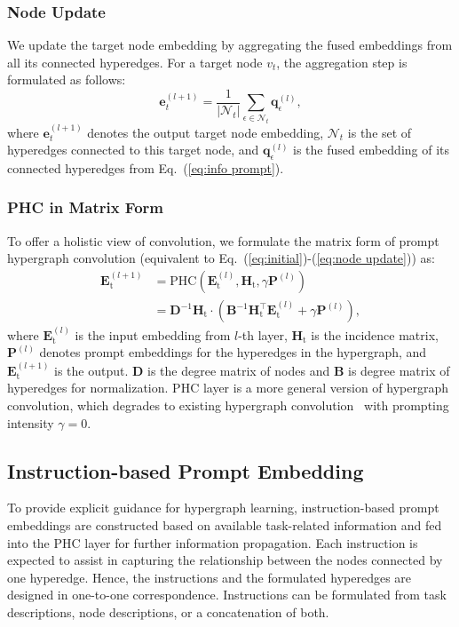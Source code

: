 \subsubsection{Node Update} We update the target node embedding by aggregating the fused embeddings from all its connected hyperedges.
For a target node $v_t$, the aggregation step is formulated as follows:
\begin{equation}\label{eq:node update}
    \mathbf{e}_t^{(l+1)} = \frac{1}{|\mathcal{N}_t|}\sum_{\epsilon\in\mathcal{N}_t}\mathbf{q}^{(l)}_{\epsilon},
\end{equation}
where $\mathbf{e}_{t}^{(l+1)}$ denotes the output target node embedding, $\mathcal{N}_t$ is the set of hyperedges connected to this target node, and $\mathbf{q}^{(l)}_{\epsilon}$ is the fused embedding of its connected hyperedges from Eq.~(\ref{eq:info prompt}).

\subsubsection{PHC in Matrix Form}
To offer a holistic view of convolution, we formulate the matrix form of prompt hypergraph convolution (equivalent to Eq.~(\ref{eq:initial})-(\ref{eq:node update})) as:
\begin{equation}\label{eq:phc}
\begin{aligned}
    \mathbf{E}_{\text{t}}^{(l+1)} &= \text{PHC}(\mathbf{E}_\text{t}^{(l)},\mathbf{H}_\text{t},\gamma\mathbf{P}^{(l)})\\
    &= \mathbf{D}^{-1}\mathbf{H}_\text{t}\cdot
   (\mathbf{B}^{-1}\mathbf{H}_\text{t}^\top\mathbf{E}_{\text{t}}^{(l)}+ \gamma\mathbf{P}^{(l)}),
\end{aligned}
\end{equation}
where $\mathbf{E}_{\text{t}}^{(l)}$ is the input embedding from $l$-th layer, $\mathbf{H}_\text{t}$ is the incidence matrix, $\mathbf{P}^{(l)}$ denotes prompt embeddings for the hyperedges in the hypergraph, and $\mathbf{E}_{\text{t}}^{(l+1)}$ is the output. 
$\mathbf{D}$ is the degree matrix of nodes and $\mathbf{B}$ is degree matrix of hyperedges for normalization. 
PHC layer is a more general version of hypergraph convolution, which degrades to existing hypergraph convolution~\cite{mhcn} with prompting intensity $\gamma = 0$.

\subsection{Instruction-based Prompt Embedding}
To provide explicit guidance for hypergraph learning, instruction-based prompt embeddings are constructed based on available task-related information and fed into the PHC layer for further information propagation. 
Each instruction is expected to assist in capturing the relationship between the nodes connected by one hyperedge. 
Hence, the instructions and the formulated hyperedges are designed in one-to-one correspondence. 
Instructions can be formulated from task descriptions, node descriptions, or a concatenation of both. 

